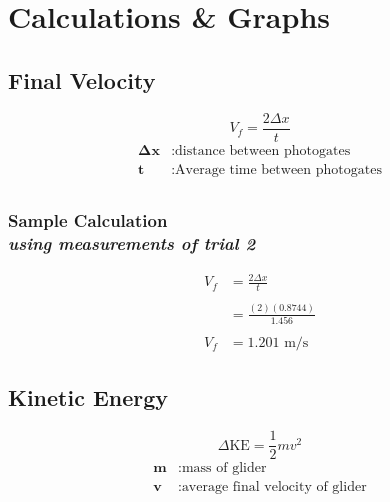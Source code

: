 
\section{Calculations \& Graphs}

\vspace{-0.5cm}
\singlespacing


\subsection{Final Velocity} 

{\centering
\begin{equation}
	V_f =  \frac{2\Delta{x}}{t} 
	\label{eq:finalV}
\end{equation}
\begin{align*}
	\boldsymbol{\Delta{x}} &: \text{distance between photogates} \\
\boldsymbol{t} &: \text{Average time between photogates} \\
\end{align*}}

\subsubsection{Sample Calculation \\ {\normalfont \small\textit{using measurements of trial 2}}}

{\centering
\begin{align*}
	V_f &=  \frac{2\Delta{x}}{t} \\ \\
			&=  \frac{(2)(0.8744)}{1.456} \\ \\ 
	V_f	&= \boxed{1.201 \text{ m/s}} 
\end{align*}}


\subsection{Kinetic Energy} 

{\centering
\begin{equation}
	\Delta{\text{KE}} = \frac{1}{2}mv^2 
	\label{eq:energyK}
\end{equation}
\begin{align*}
	\boldsymbol{m} &: \text{mass of glider} \\
	\boldsymbol{v} &: \text{average final velocity of glider} 
\end{align*}}


